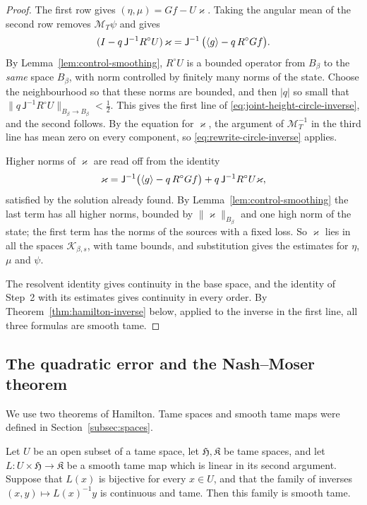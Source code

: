 \begin{proof}
The first row gives $(\eta,\mu)=Gf-U\varkappa$. Taking the angular
mean of the second row removes $\mathcal M_T\psi$ and gives
\[
 (I-q\,\mathsf J^{-1}R^\circ U)\,\varkappa
              =\mathsf J^{-1}\,\bigl(\langle g\rangle-q\,R^\circ Gf\bigr).
\]
By Lemma~\ref{lem:control-smoothing}, $R^\circ U$ is a bounded
operator from $B_\beta$ to the \emph{same} space $B_\beta$, with norm
controlled by finitely many norms of the state. Choose the
neighbourhood so that these norms are bounded, and then $|q|$ so small
that $\|q\,\mathsf J^{-1}R^\circ U\|_{B_\beta\to B_\beta}<\tfrac12$.
This gives the first line of
\eqref{eq:joint-height-circle-inverse}, and the second follows. By
the equation for $\varkappa$, the argument of $\mathcal M_T^{-1}$ in
the third line has mean zero on every component, so
\eqref{eq:rewrite-circle-inverse} applies.

Higher norms of $\varkappa$ are read off from the identity
\[
 \varkappa=\mathsf J^{-1}\bigl(\langle g\rangle-q\,R^\circ Gf\bigr)
      +q\,\mathsf J^{-1}R^\circ U\varkappa ,
\]
satisfied by the solution already found. By
Lemma~\ref{lem:control-smoothing} the last term has all higher norms,
bounded by $\|\varkappa\|_{B_\beta}$ and one high norm of the state;
the first term has the norms of the sources with a fixed loss. So
$\varkappa$ lies in all the spaces $\mathcal K_{\beta,s}$, with tame
bounds, and substitution gives the estimates for $\eta$, $\mu$ and
$\psi$.

The resolvent identity gives continuity in the base space, and the
identity of Step~2 with its estimates gives continuity in every
order. By Theorem~\ref{thm:hamilton-inverse} below, applied to the
inverse in the first line, all three formulas are smooth tame.
\end{proof}

\subsection{The quadratic error and the Nash--Moser theorem}

We use two theorems of Hamilton. Tame spaces and smooth tame maps
were defined in Section~\ref{subsec:spaces}.

\begin{theorem}
\label{thm:hamilton-inverse}
Let $U$ be an open subset of a tame space, let
$\mathfrak H,\mathfrak K$ be tame spaces, and let
$L:U\times\mathfrak H\to\mathfrak K$ be a smooth tame map which is
linear in its second argument. Suppose that $L(x)$ is bijective for
every $x\in U$, and that the family of inverses
$(x,y)\mapsto L(x)^{-1}y$ is continuous and tame. Then this family is
smooth tame.
\end{theorem}

